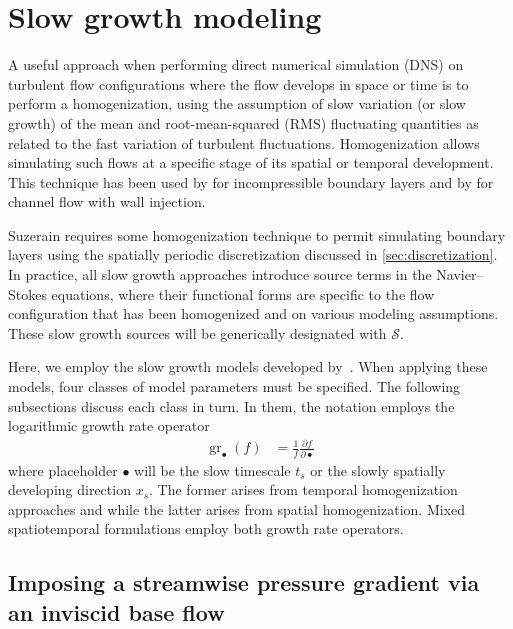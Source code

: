 \documentclass[letterpaper,11pt,nointlimits,reqno,draft]{amsbook}
\newcommand{\Ssd}{\ensuremath{\mathcal{S}}} %
\begin{document}
\section{Slow growth modeling}
\label{sec:slowgrowthmodels}

A useful approach when performing direct numerical simulation (DNS) on turbulent
flow configurations where the flow develops in space or time is to perform a
homogenization, using the assumption of slow variation (or slow growth) of the
mean and root-mean-squared (RMS) fluctuating quantities as related to the fast
variation of turbulent fluctuations.  Homogenization allows simulating such
flows at a specific stage of its spatial or temporal development.  This
technique has been used by \citet{Spalart1988Direct} for incompressible boundary
layers and by \citet{Venugopal2003} for channel flow with wall injection.

Suzerain requires some homogenization technique to permit simulating boundary
layers using the spatially periodic discretization discussed in
\autoref{sec:discretization}.  In practice, all slow growth approaches introduce
source terms in the Navier--Stokes equations, where their functional forms are
specific to the flow configuration that has been homogenized and on various
modeling assumptions.  These slow growth sources will be generically designated
with $\Ssd$.

Here, we employ the slow growth models developed by~\citet{Topalian2013Direct}.
  When applying these models, four classes of
model parameters must be specified.  The following subsections discuss each
class in turn.  In them, the notation employs the logarithmic growth rate
operator
%
%
\begin{align}
    \operatorname{gr}_{\bullet}\!\left(f\right) &=
    \frac{1}{f} \frac{\partial f}{\partial \bullet}
\end{align}
where placeholder $\bullet$ will be the slow timescale $t_s$ or the slowly
spatially developing direction $x_s$.  The former arises from temporal
homogenization approaches and while the latter arises from spatial
homogenization.  Mixed spatiotemporal formulations employ both growth rate
operators.

\subsection{Imposing a streamwise pressure gradient via an inviscid base flow}
\label{seq:imposing_fpg}
\end{document}
